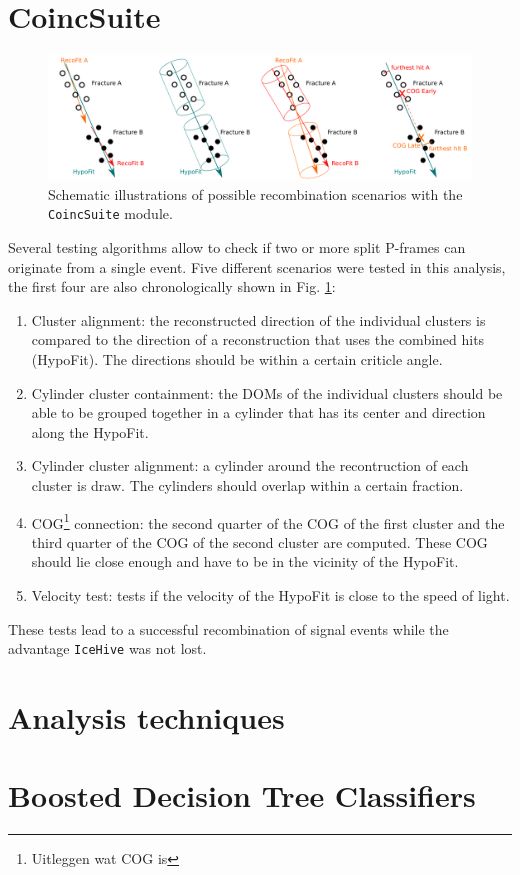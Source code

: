 \section{CoincSuite}
\begin{figure}[t]
\centering
\includegraphics[width=\textwidth]{chapter7/img/coincsuite.png}
\caption{Schematic illustrations of possible recombination scenarios with the \texttt{CoincSuite} module.}
\label{fig:coincsuite}
\end{figure}
Several testing algorithms allow to check if two or more split P-frames can originate from a single event. Five different scenarios were tested in this analysis, the first four are also chronologically shown in Fig. \ref{fig:coincsuite}:
\vspace{2mmtw
}
\begin{enumerate}
\item Cluster alignment: the reconstructed direction of the individual clusters is compared to the direction of a reconstruction that uses the combined hits (HypoFit). The directions should be within a certain criticle angle.
\item Cylinder cluster containment: the DOMs of the individual clusters should be able to be grouped together in a cylinder that has its center and direction along the HypoFit.
\item Cylinder cluster alignment: a cylinder around the recontruction of each cluster is draw. The cylinders should overlap within a certain fraction.
\item COG\footnote{Uitleggen wat COG is} connection: the second quarter of the COG of the first cluster and the third quarter of the COG of the second cluster are computed. These COG should lie close enough and have to be in the vicinity of the HypoFit.
\item Velocity test: tests if the velocity of the HypoFit is close to the speed of light.
\end{enumerate}

\vspace{2mm}
\noindent These tests lead to a successful recombination of signal events while the advantage \texttt{IceHive} was not lost.



\section{Analysis techniques}
\section{Boosted Decision Tree Classifiers}